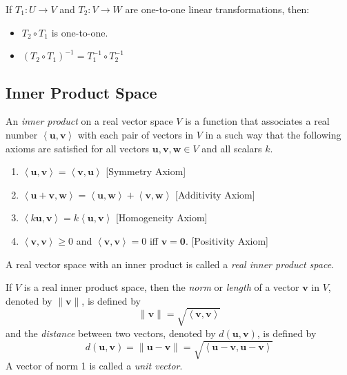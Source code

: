\documentclass{report}
\begin{document}
		\begin{thm}
			If $T_1:U \rightarrow V$ and $T_2:V \rightarrow W$ are one-to-one linear transformations, then:
			\begin{itemize}
				\item $T_2 \circ T_1$ is one-to-one.
				\item $(T_2 \circ T_1)^{-1}=T_1^{-1} \circ T_2^{-1}$
			\end{itemize}
		\end{thm}
		
		\subsection{Inner Product Space}\label{chap_inner_product_space}
			\begin{defn}
				An \emph{inner product} on a real vector space $V$ is a function that associates a real number $\left<\bm{u},\bm{v}\right>$ with each pair of vectors in $V$ in a such way that the following axioms are satisfied for all vectors $\bm{u},\bm{v},\bm{w}\in V$ and all scalars $k$.
				\begin{enumerate}
					\item $\left<\bm{u},\bm{v}\right>=\left<\bm{v},\bm{u}\right>$ [Symmetry Axiom]
					\item $\left<\bm{u}+\bm{v},\bm{w}\right>=\left<\bm{u},\bm{w}\right>+\left<\bm{v},\bm{w}\right>$ [Additivity Axiom]
					\item $\left<k\bm{u},\bm{v}\right>=k\left<\bm{u},\bm{v}\right>$ [Homogeneity Axiom]
					\item $\left<\bm{v},\bm{v}\right> \ge 0$ and $\left<\bm{v},\bm{v}\right>=0$ iff $\bm{v}=\bm{0}$. [Positivity Axiom]
				\end{enumerate}
				A real vector space with an inner product is called a \emph{real inner product space}.
			\end{defn}
			
			\begin{defn}
				If $V$ is a real inner product space, then the \emph{norm} or \emph{length} of a vector $\bm{v}$ in $V$, denoted by $\|\bm{v}\|$, is defined by
				\begin{displaymath}
					\|\bm{v}\|=\sqrt{\left<\bm{v},\bm{v}\right>}
				\end{displaymath}
				and the \emph{distance} between two vectors, denoted by $d(\bm{u},\bm{v})$, is defined by
				\begin{displaymath}
					d(\bm{u},\bm{v})=\|\bm{u}-\bm{v}\|=\sqrt{\left<\bm{u}-\bm{v},\bm{u}-\bm{v}\right>}
				\end{displaymath}
				A vector of norm 1 is called a \emph{unit vector}.
			\end{defn}
			
\end{document}

